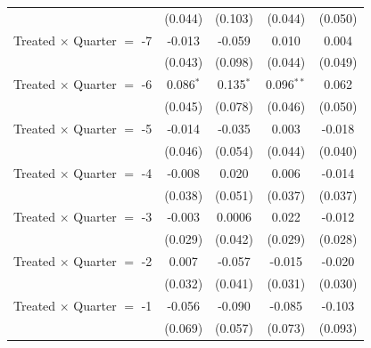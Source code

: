 \begin{longtable}{lcccc}
                                  & (0.044)                                            & (0.103)        & (0.044)        & (0.050)        \\
  Treated $\times$ Quarter $=$ -7 & -0.013                                             & -0.059         & 0.010          & 0.004          \\
                                  & (0.043)                                            & (0.098)        & (0.044)        & (0.049)        \\
  Treated $\times$ Quarter $=$ -6 & 0.086$^{*}$                                        & 0.135$^{*}$    & 0.096$^{**}$   & 0.062          \\
                                  & (0.045)                                            & (0.078)        & (0.046)        & (0.050)        \\
  Treated $\times$ Quarter $=$ -5 & -0.014                                             & -0.035         & 0.003          & -0.018         \\
                                  & (0.046)                                            & (0.054)        & (0.044)        & (0.040)        \\
  Treated $\times$ Quarter $=$ -4 & -0.008                                             & 0.020          & 0.006          & -0.014         \\
                                  & (0.038)                                            & (0.051)        & (0.037)        & (0.037)        \\
  Treated $\times$ Quarter $=$ -3 & -0.003                                             & 0.0006         & 0.022          & -0.012         \\
                                  & (0.029)                                            & (0.042)        & (0.029)        & (0.028)        \\
  Treated $\times$ Quarter $=$ -2 & 0.007                                              & -0.057         & -0.015         & -0.020         \\
                                  & (0.032)                                            & (0.041)        & (0.031)        & (0.030)        \\
  Treated $\times$ Quarter $=$ -1 & -0.056                                             & -0.090         & -0.085         & -0.103         \\
                                  & (0.069)                                            & (0.057)        & (0.073)        & (0.093)        \\

\end{longtable}
